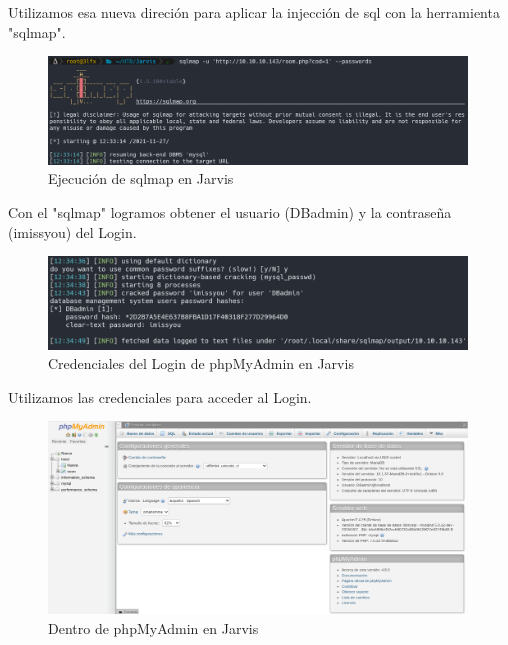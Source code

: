         \large{Utilizamos esa nueva direción para aplicar la injección de sql con la herramienta "sqlmap".}
        \par
        \begin{figure}[H]
            \centering
            \includegraphics[width=0.99\textwidth]{imagenes/jarvis/08_sql_map_jarvis.png}
            \caption{Ejecución de sqlmap en Jarvis}
        \end{figure}

        \large{Con el "sqlmap" logramos obtener el usuario (DBadmin) y la contraseña (imissyou) del Login.}
        \par
        \begin{figure}[H]
            \centering
            \includegraphics[width=0.99\textwidth]{imagenes/jarvis/09_db_pass_jarvis.png}
            \caption{Credenciales del Login de phpMyAdmin en Jarvis}
        \end{figure}

        \large{Utilizamos las credenciales para acceder al Login.}
        \par
        \begin{figure}[H]
            \centering
            \includegraphics[width=0.99\textwidth]{imagenes/jarvis/10_phpmyadmin_dentro_jarvis.png}
            \caption{Dentro de phpMyAdmin en Jarvis}
        \end{figure}

